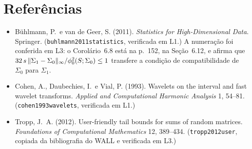 \documentclass[11pt]{article}
\begin{document}
\section*{Referências}

\begin{itemize}[leftmargin=*]
    \item Bühlmann, P.\ e van de Geer, S. (2011). \emph{Statistics for High-Dimensional Data}. Springer.
    (\texttt{buhlmann2011statistics}, verificada em L1.) A numeração foi conferida em L3: o Corolário~6.8 está
    na p.~152, na Seção~6.12, e afirma que $32\,s\,\lVert\Sigma_1-\Sigma_0\rVert_\infty/\phi_{0}^2(S;\Sigma_0) \le 1$
    transfere a condição de compatibilidade de $\Sigma_0$ para $\Sigma_1$.
    \item Cohen, A., Daubechies, I.\ e Vial, P. (1993). Wavelets on the interval and fast wavelet transforms.
    \emph{Applied and Computational Harmonic Analysis} 1, 54--81. (\texttt{cohen1993wavelets}, verificada em L1.)
    \item Tropp, J.~A. (2012). User-friendly tail bounds for sums of random matrices. \emph{Foundations of
    Computational Mathematics} 12, 389--434. (\texttt{tropp2012user}, copiada da bibliografia do WALL e
    verificada em L3.)
\end{itemize}
\end{document}
